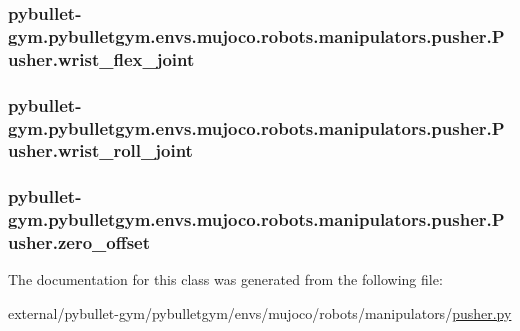 \subsubsection[{\texorpdfstring{wrist\+\_\+flex\+\_\+joint}{wrist_flex_joint}}]{\setlength{\rightskip}{0pt plus 5cm}pybullet-\/gym.\+pybulletgym.\+envs.\+mujoco.\+robots.\+manipulators.\+pusher.\+Pusher.\+wrist\+\_\+flex\+\_\+joint}\hypertarget{classpybullet-gym_1_1pybulletgym_1_1envs_1_1mujoco_1_1robots_1_1manipulators_1_1pusher_1_1_pusher_a704a97d2fdc00c3d6b5b22b1fab9a3ac}{}\label{classpybullet-gym_1_1pybulletgym_1_1envs_1_1mujoco_1_1robots_1_1manipulators_1_1pusher_1_1_pusher_a704a97d2fdc00c3d6b5b22b1fab9a3ac}
\subsubsection[{\texorpdfstring{wrist\+\_\+roll\+\_\+joint}{wrist_roll_joint}}]{\setlength{\rightskip}{0pt plus 5cm}pybullet-\/gym.\+pybulletgym.\+envs.\+mujoco.\+robots.\+manipulators.\+pusher.\+Pusher.\+wrist\+\_\+roll\+\_\+joint}\hypertarget{classpybullet-gym_1_1pybulletgym_1_1envs_1_1mujoco_1_1robots_1_1manipulators_1_1pusher_1_1_pusher_a4be74203917dfead512dfc4a3706cf02}{}\label{classpybullet-gym_1_1pybulletgym_1_1envs_1_1mujoco_1_1robots_1_1manipulators_1_1pusher_1_1_pusher_a4be74203917dfead512dfc4a3706cf02}
\subsubsection[{\texorpdfstring{zero\+\_\+offset}{zero_offset}}]{\setlength{\rightskip}{0pt plus 5cm}pybullet-\/gym.\+pybulletgym.\+envs.\+mujoco.\+robots.\+manipulators.\+pusher.\+Pusher.\+zero\+\_\+offset}\hypertarget{classpybullet-gym_1_1pybulletgym_1_1envs_1_1mujoco_1_1robots_1_1manipulators_1_1pusher_1_1_pusher_ac42ae736028cadda2f038a5cee4498f3}{}\label{classpybullet-gym_1_1pybulletgym_1_1envs_1_1mujoco_1_1robots_1_1manipulators_1_1pusher_1_1_pusher_ac42ae736028cadda2f038a5cee4498f3}


The documentation for this class was generated from the following file\+:\begin{DoxyCompactItemize}
\item 
external/pybullet-\/gym/pybulletgym/envs/mujoco/robots/manipulators/\hyperlink{mujoco_2robots_2manipulators_2pusher_8py}{pusher.\+py}\end{DoxyCompactItemize}
